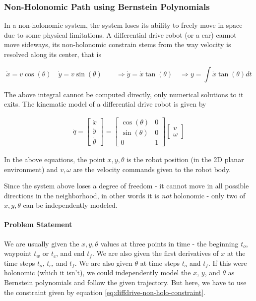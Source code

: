 \subsubsection{Non-Holonomic Path using Bernstein Polynomials}

In a non-holonomic system, the system loses its ability to freely move in space due to some physical limitations. A differential drive robot (or a car) cannot move sideways, its non-holonomic constrain stems from the way velocity is resolved along its center, that is

\begin{equation}
    \dot{x} = v \cos(\theta) \quad 
    \dot{y} = v \sin(\theta) \quad\quad
    \Rightarrow \dot{y} = \dot{x} \tan(\theta) \quad
    \Rightarrow y = \int{\dot{x} \tan \left ( \theta \right ) dt}
    \label{eq:diffdrive-non-holo-constraint}
\end{equation}

The above integral cannot be computed directly, only numerical solutions to it exits. The kinematic model of a differential drive robot is given by

\begin{align*}
    \dot{q} = \begin{bmatrix}
        \dot{x} \\ \dot{y} \\ \dot{\theta}
    \end{bmatrix} = \begin{bmatrix}
    \cos(\theta) & 0 \\
    \sin(\theta) & 0 \\
    0 & 1
    \end{bmatrix} \begin{bmatrix}
    v \\ \omega
    \end{bmatrix}
\end{align*}

In the above equations, the point  $x, y, \theta$ is the robot position (in the 2D planar environment) and $v, \omega$ are the velocity commands given to the robot body.

Since the system above loses a degree of freedom - it cannot move in all possible directions in the neighborhood, in other words it is \emph{not} holonomic - only two of $x, y, \theta$ can be independently modeled.

\paragraph*{Problem Statement}
We are usually given the $x, y, \theta$ values at three points in time - the beginning $t_o$, waypoint $t_w$ or $t_c$, and end $t_f$. We are also given the first derivatives of $x$ at the time steps $t_o$, $t_c$, and $t_f$. We are also given $\dot{\theta}$ at time steps $t_o$ and $t_f$.
If this were holonomic (which it isn't), we could independently model the $x$, $y$, and $\theta$ as Bernstein polynomials and follow the given trajectory. But here, we have to use the constraint given by equation \ref{eq:diffdrive-non-holo-constraint}.

